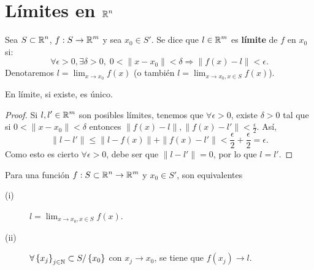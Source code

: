 \chapter{Límites en $\displaystyle \mathbb{R}^{n} $}
\begin{definition}[Límite]
Sea $\displaystyle S \subset \mathbb{R}^{n} $, $\displaystyle f : S \to \mathbb{R}^{m} $ y sea $\displaystyle x_{0} \in S' $. Se dice que $\displaystyle l \in \mathbb{R}^{m} $ es \textbf{límite} de $\displaystyle f $ en $\displaystyle x_{0} $ si:
\[\forall \epsilon > 0, \exists\delta > 0, \; 0 < \|x-x_{0}\| < \delta \Rightarrow \|f\left(x\right)-l\|<\epsilon  .\]
Denotaremos $\displaystyle  l = \lim_{x \to x_{0}}f\left(x\right) $ (o también $\displaystyle l = \lim_{x \to x_{0}, x \in S}f\left(x\right) $). 
\end{definition}
\begin{prop}
En límite, si existe, es único.
\end{prop}
\begin{proof}
Si $\displaystyle l,l' \in \mathbb{R}^{m} $ son posibles límites, tenemos que $\displaystyle \forall \epsilon > 0 $, existe $\displaystyle \delta > 0 $ tal que si $\displaystyle 0 < \| x - x_{0}\| < \delta  $ entonces $\displaystyle \|f\left(x\right) -l\|,\|f\left(x\right)-l'\| < \frac{\epsilon }{2} $. Así,
\[ \| l - l'\| \leq \|l - f\left(x\right)\| + \|f\left(x\right)-l'\| < \frac{\epsilon }{2} + \frac{\epsilon }{2} = \epsilon  .\]
Como esto es cierto $\displaystyle \forall \epsilon > 0 $, debe ser que $\displaystyle \| l - l'\| = 0 $, por lo que $\displaystyle l = l' $.
\end{proof}
\begin{prop}
	Para una función $\displaystyle f : S \subset \mathbb{R}^{n} \to \mathbb{R}^{m} $ y $\displaystyle x_{0} \in S' $, son equivalentes
	\begin{description}
	\item[(i)] $\displaystyle l = \lim_{x \to x_{0}, x \in S}f\left(x\right) $. 
	\item[(ii)] $\displaystyle \forall \left\{ x_{j}\right\} _{j\in \mathbb{N}}\subset S / \left\{ x_{0}\right\}  $ con $\displaystyle x_{j} \to x_{0} $, se tiene que $\displaystyle f\left(x_{j}\right) \to l $.
	\end{description}
\end{prop}
